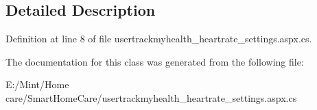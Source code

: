 \subsection{Detailed Description}


Definition at line 8 of file usertrackmyhealth\-\_\-heartrate\-\_\-settings.\-aspx.\-cs.



The documentation for this class was generated from the following file\-:\begin{DoxyCompactItemize}
\item 
E\-:/\-Mint/\-Home care/\-Smart\-Home\-Care/usertrackmyhealth\-\_\-heartrate\-\_\-settings.\-aspx.\-cs\end{DoxyCompactItemize}
